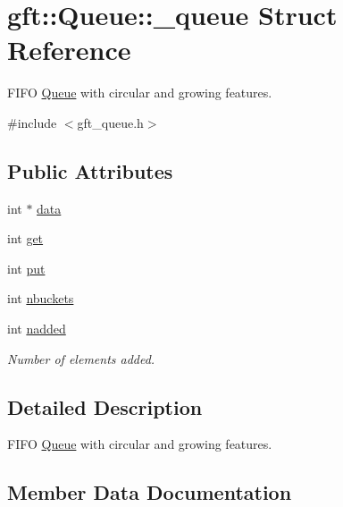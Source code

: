 \hypertarget{structgft_1_1Queue_1_1__queue}{}\section{gft\+:\+:Queue\+:\+:\+\_\+queue Struct Reference}
\label{structgft_1_1Queue_1_1__queue}


F\+I\+FO \hyperlink{namespacegft_1_1Queue}{Queue} with circular and growing features.  




{\ttfamily \#include $<$gft\+\_\+queue.\+h$>$}

\subsection*{Public Attributes}
\begin{DoxyCompactItemize}
\item 
int $\ast$ \hyperlink{structgft_1_1Queue_1_1__queue_a306d1f000046c6b8f31cdbaa79073401}{data}
\item 
int \hyperlink{structgft_1_1Queue_1_1__queue_a8c802bf1bbd217d89aea8a71cc3f6ee8}{get}
\item 
int \hyperlink{structgft_1_1Queue_1_1__queue_a48a458b35f17d2a4460e8675508e872c}{put}
\item 
int \hyperlink{structgft_1_1Queue_1_1__queue_a07cec5556e3d465ec8487e6142071b10}{nbuckets}
\item 
int \hyperlink{structgft_1_1Queue_1_1__queue_ad93612d6060096d1561bd99327e8b70c}{nadded}
\begin{DoxyCompactList}\small\item\em Number of elements added. \end{DoxyCompactList}\end{DoxyCompactItemize}


\subsection{Detailed Description}
F\+I\+FO \hyperlink{namespacegft_1_1Queue}{Queue} with circular and growing features. 

\subsection{Member Data Documentation}
